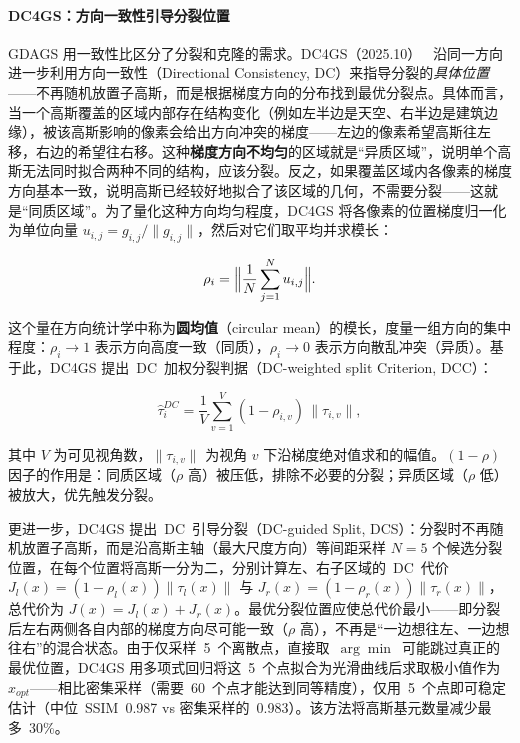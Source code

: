 \paragraph{DC4GS：方向一致性引导分裂位置}
GDAGS 用一致性比区分了分裂和克隆的需求。DC4GS（2025.10）~\cite{2510_26921} 沿同一方向进一步利用方向一致性（Directional Consistency, DC）来指导分裂的\emph{具体位置}——不再随机放置子高斯，而是根据梯度方向的分布找到最优分裂点。具体而言，当一个高斯覆盖的区域内部存在结构变化（例如左半边是天空、右半边是建筑边缘），被该高斯影响的像素会给出方向冲突的梯度——左边的像素希望高斯往左移，右边的希望往右移。这种\textbf{梯度方向不均匀}的区域就是``异质区域''，说明单个高斯无法同时拟合两种不同的结构，应该分裂。反之，如果覆盖区域内各像素的梯度方向基本一致，说明高斯已经较好地拟合了该区域的几何，不需要分裂——这就是``同质区域''。为了量化这种方向均匀程度，DC4GS 将各像素的位置梯度归一化为单位向量 $u_{i,j} = g_{i,j}/\|g_{i,j}\|$，然后对它们取平均并求模长：

\begin{equation*}
\rho_i = \Bigl\|\frac{1}{N}\sum_{j=1}^{N} u_{i,j}\Bigr\|.
\end{equation*}

这个量在方向统计学中称为\textbf{圆均值}（circular mean）的模长，度量一组方向的集中程度：$\rho_i \to 1$ 表示方向高度一致（同质），$\rho_i \to 0$ 表示方向散乱冲突（异质）。基于此，DC4GS 提出~DC~加权分裂判据（DC-weighted split Criterion, DCC）：

\begin{equation*}
\hat{\tau}_i^{DC} = \frac{1}{V}\sum_{v=1}^{V}(1-\rho_{i,v})\,\|\tau_{i,v}\|,
\end{equation*}

其中 $V$ 为可见视角数，$\|\tau_{i,v}\|$ 为视角 $v$ 下沿梯度绝对值求和的幅值。$(1{-}\rho)$ 因子的作用是：同质区域（$\rho$ 高）被压低，排除不必要的分裂；异质区域（$\rho$ 低）被放大，优先触发分裂。

更进一步，DC4GS 提出~DC~引导分裂（DC-guided Split, DCS）：分裂时不再随机放置子高斯，而是沿高斯主轴（最大尺度方向）等间距采样 $N{=}5$ 个候选分裂位置，在每个位置将高斯一分为二，分别计算左、右子区域的~DC~代价 $J_l(x) = (1{-}\rho_l(x))\|\tau_l(x)\|$ 与 $J_r(x) = (1{-}\rho_r(x))\|\tau_r(x)\|$，总代价为 $J(x) = J_l(x) + J_r(x)$。最优分裂位置应使总代价最小——即分裂后左右两侧各自内部的梯度方向尽可能一致（$\rho$ 高），不再是``一边想往左、一边想往右''的混合状态。由于仅采样~5~个离散点，直接取~$\arg\min$~可能跳过真正的最优位置，DC4GS 用多项式回归将这~5~个点拟合为光滑曲线后求取极小值作为~$x_{opt}$——相比密集采样（需要~60~个点才能达到同等精度），仅用~5~个点即可稳定估计（中位~SSIM~0.987 vs 密集采样的~0.983）。该方法将高斯基元数量减少最多~30\%。

